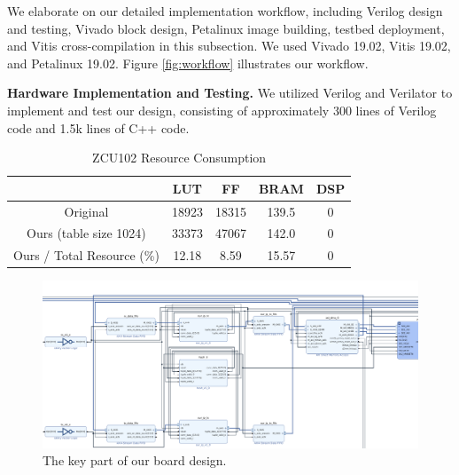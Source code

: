 We elaborate on our detailed implementation workflow, including Verilog design and testing, Vivado block design, Petalinux image building, testbed deployment, and Vitis cross-compilation in this subsection. We used Vivado 19.02, Vitis 19.02, and Petalinux 19.02. Figure \ref{fig:workflow} illustrates our workflow.

\textbf{Hardware Implementation and Testing.} We utilized Verilog and Verilator to implement and test our design, consisting of approximately 300 lines of Verilog code and 1.5k lines of C++ code.

\begin{table}[h]
    \caption{ZCU102 Resource Consumption}
    \label{tab:res}
    \begin{tabular}{c|cccc}
      \toprule
        & LUT & FF & BRAM & DSP\\
      \midrule
      Original & 18923 & 18315 & 139.5 & 0\\
      Ours (table size 1024) & 33373 & 47067 & 142.0 & 0\\
      \midrule
      Ours / Total Resource (\%) & 12.18 & 8.59 & 15.57 & 0\\
      \bottomrule
  \end{tabular}
\end{table}

\begin{figure}[t]
    \centering
    \includegraphics[width=400pt]{images/brd.png}
    \caption{The key part of our board design.}
    \label{fig:brd}
\end{figure}

